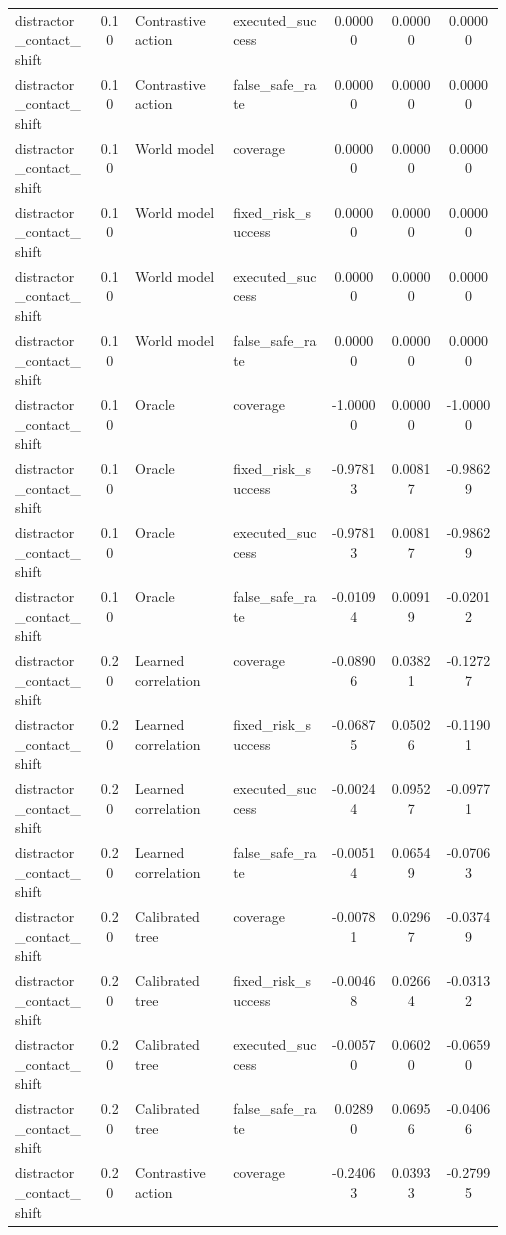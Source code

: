 \documentclass{article}
\begin{document}
\begin{center}
\begin{longtable}{p{0.17\linewidth}cp{0.20\linewidth}p{0.20\linewidth}ccc}
distractor\_contact\_shift & 0.10 & Contrastive action & executed\_success & 0.00000 & 0.00000 & 0.00000\\
distractor\_contact\_shift & 0.10 & Contrastive action & false\_safe\_rate & 0.00000 & 0.00000 & 0.00000\\
distractor\_contact\_shift & 0.10 & World model & coverage & 0.00000 & 0.00000 & 0.00000\\
distractor\_contact\_shift & 0.10 & World model & fixed\_risk\_success & 0.00000 & 0.00000 & 0.00000\\
distractor\_contact\_shift & 0.10 & World model & executed\_success & 0.00000 & 0.00000 & 0.00000\\
distractor\_contact\_shift & 0.10 & World model & false\_safe\_rate & 0.00000 & 0.00000 & 0.00000\\
distractor\_contact\_shift & 0.10 & Oracle & coverage & -1.00000 & 0.00000 & -1.00000\\
distractor\_contact\_shift & 0.10 & Oracle & fixed\_risk\_success & -0.97813 & 0.00817 & -0.98629\\
distractor\_contact\_shift & 0.10 & Oracle & executed\_success & -0.97813 & 0.00817 & -0.98629\\
distractor\_contact\_shift & 0.10 & Oracle & false\_safe\_rate & -0.01094 & 0.00919 & -0.02012\\
distractor\_contact\_shift & 0.20 & Learned correlation & coverage & -0.08906 & 0.03821 & -0.12727\\
distractor\_contact\_shift & 0.20 & Learned correlation & fixed\_risk\_success & -0.06875 & 0.05026 & -0.11901\\
distractor\_contact\_shift & 0.20 & Learned correlation & executed\_success & -0.00244 & 0.09527 & -0.09771\\
distractor\_contact\_shift & 0.20 & Learned correlation & false\_safe\_rate & -0.00514 & 0.06549 & -0.07063\\
distractor\_contact\_shift & 0.20 & Calibrated tree & coverage & -0.00781 & 0.02967 & -0.03749\\
distractor\_contact\_shift & 0.20 & Calibrated tree & fixed\_risk\_success & -0.00468 & 0.02664 & -0.03132\\
distractor\_contact\_shift & 0.20 & Calibrated tree & executed\_success & -0.00570 & 0.06020 & -0.06590\\
distractor\_contact\_shift & 0.20 & Calibrated tree & false\_safe\_rate & 0.02890 & 0.06956 & -0.04066\\
distractor\_contact\_shift & 0.20 & Contrastive action & coverage & -0.24063 & 0.03933 & -0.27995\\

\end{longtable}
\end{center}
\end{document}
